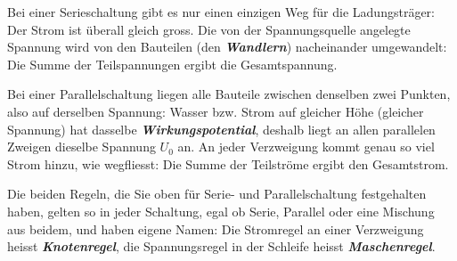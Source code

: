 \documentclass[addpoints,11pt,a4paper]{exam}
\newcommand{\Teiltitel}[2]{%
  \noindent{\Large\bfseries\color{#1}#2}\par
  \vspace{1pt}\noindent{\color{#1}\rule{\linewidth}{0.8pt}}\par\smallskip\noindent
}
\newenvironment{theoriebox}[1][Theorie]{%
  \par\addvspace{12pt}\Teiltitel{titleblue}{#1}
}{%
  \par\addvspace{10pt}
}
\begin{document}
\needspace{8cm}
\begin{theoriebox}[Merksätze]

\begin{formelbox}
Bei einer Serieschaltung gibt es nur einen einzigen Weg für die
Ladungsträger: Der Strom ist überall gleich gross. Die von der
Spannungsquelle angelegte Spannung wird von den Bauteilen (den
\textbf{\emph{Wandlern}}) nacheinander umgewandelt: Die Summe der
Teilspannungen ergibt die Gesamtspannung.
\end{formelbox}

\begin{formelbox}
Bei einer Parallelschaltung liegen alle Bauteile zwischen denselben zwei
Punkten, also auf derselben Spannung: Wasser bzw. Strom auf gleicher
Höhe (gleicher Spannung) hat dasselbe \textbf{\emph{Wirkungspotential}},
deshalb liegt an allen parallelen Zweigen dieselbe Spannung $U_0$ an. An
jeder Verzweigung kommt genau so viel Strom hinzu, wie wegfliesst: Die
Summe der Teilströme ergibt den Gesamtstrom.
\end{formelbox}

\begin{formelbox}
Die beiden Regeln, die Sie oben für Serie- und Parallelschaltung
festgehalten haben, gelten so in jeder Schaltung, egal ob Serie,
Parallel oder eine Mischung aus beidem, und haben eigene Namen: Die
Stromregel an einer Verzweigung heisst \textbf{\emph{Knotenregel}}, die
Spannungsregel in der Schleife heisst \textbf{\emph{Maschenregel}}.
\end{formelbox}

\end{theoriebox}
\end{document}
